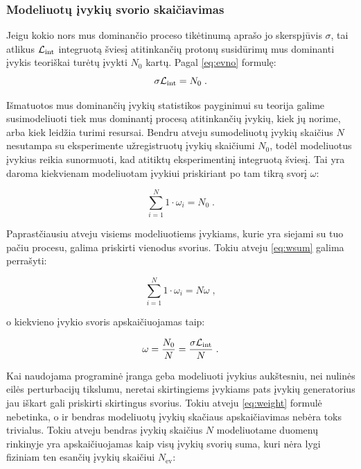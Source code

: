 \documentclass[a4paper, 12pt]{article}
\newcommand{\Lumi}{{\cal L}_\mathrm{int}}
\newlength\q
\begin{document}
\subsubsection{Modeliuotų įvykių svorio skaičiavimas}\label{sec:MCweight}

Jeigu kokio nors mus dominančio proceso tikėtinumą aprašo jo skerspjūvis $\sigma$, tai atlikus
$\Lumi$ integruotą šviesį atitinkančių protonų susidūrimų mus dominanti įvykis teoriškai turėtų
įvykti $N_{0}$ kartų. Pagal \eqref{eq:evno} formulę:
\begin{equation}
	\sigma \Lumi=N_{0} \; .
	\label{eq:ilumi}
\end{equation}

Išmatuotos mus dominančių įvykių statistikos payginimui su teorija galime susimodeliuoti tiek mus
dominantį procesą atitinkančių įvykių, kiek jų norime, arba kiek leidžia turimi resursai.
Bendru atveju sumodeliuotų įvykių skaičius $N$ nesutampa su eksperimente užregistruotų įvykių
skaičiumi $N_0$, todėl modeliuotus įvykius reikia sunormuoti, kad atitiktų eksperimentinį
integruotą šviesį.
Tai yra daroma kiekvienam modeliuotam įvykiui priskiriant po tam tikrą svorį $\omega$:

\begin{equation}
	\sum_{i=1}^{N}1\cdot \omega_{i}=N_{0} \; .
	\label{eq:wsum}
\end{equation}

Paprastčiausiu atveju visiems modeliuotiems įvykiams, kurie yra siejami su tuo pačiu procesu,
galima priskirti vienodus svorius. Tokiu atveju \eqref{eq:wsum} galima perrašyti:

\begin{equation}
	\sum_{i=1}^{N} 1 \cdot \omega_{i} = N \omega \; ,
	\label{eq:swsum}
\end{equation}

o kiekvieno įvykio svoris apskaičiuojamas taip:

\begin{equation}
	\omega = \frac{ N_{0} }{ N } = \frac{ \sigma \Lumi }{N} \; .
	\label{eq:weight}
\end{equation}

Kai naudojama programinė įranga geba modeliuoti įvykius aukštesniu, nei nulinės eilės
perturbacijų tikslumu, neretai skirtingiems įvykiams pats įvykių generatorius jau iškart
gali priskirti skirtingus svorius.
Tokiu atveju \eqref{eq:weight} formulė nebetinka, o ir bendras modeliuotų įvykių skačiaus
apskaičiavimas nebėra toks trivialus.
Tokiu atveju bendras įvykių skaičius $N$ modeliuotame duomenų rinkinyje yra apskaičiuojamas
kaip visų įvykių svorių suma, kuri nėra lygi fiziniam ten esančių įvykių skaičiui $N_{\mathrm{ev}}$:
\end{document}
